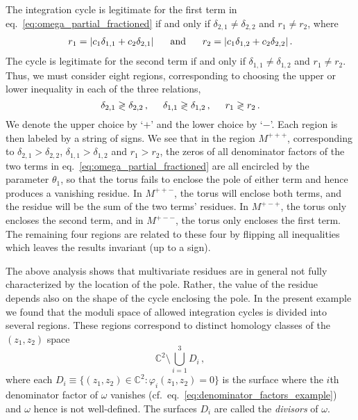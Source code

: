 \documentclass[dvipsnames,preprint,12pt,sort&compress]{elsarticle}
\begin{document}
The integration cycle is legitimate for the first term in eq.~\eqref{eq:omega_partial_fractioned}
if and only if $\delta_{2,1} \neq \delta_{2,2}$ and $r_1 \neq r_2$, where
\begin{align}
r_1 = |c_1\delta_{1,1}+c_2\delta_{2,1}| \hspace{6mm} \mathrm{and} \hspace{6mm}
r_2 = |c_1\delta_{1,2}+c_2\delta_{2,2}|\,.
\end{align}
The cycle is legitimate for the second term if and only if
$\delta_{1,1}\neq\delta_{1,2}$ and $r_1 \neq r_2$. Thus, we must consider
eight regions, corresponding to choosing the upper or lower
inequality in each of the three relations,
\begin{equation}
\delta_{2,1}\gtrless\delta_{2,2}\,, \hspace{5mm}
\delta_{1,1}\gtrless\delta_{1,2}\,, \hspace{5mm}
r_1\gtrless r_2\,.
\label{eq:moduli_space_boundaries}
\end{equation}
We denote the upper choice by `$+$' and the lower choice by `$-$'. Each
region is then labeled by a string of signs. We see that in the region $M^{+++}$,
corresponding to $\delta_{2,1} > \delta_{2,2}$, $\delta_{1,1} > \delta_{1,2}$ and $r_1 > r_2$,
the zeros of all denominator factors of the two terms in eq.~\eqref{eq:omega_partial_fractioned}
are all encircled by the parameter $\theta_1$, so that the torus fails to enclose
the pole of either term and hence produces a vanishing residue.
In $M^{++-}$, the torus will enclose both terms, and the residue will be the sum of
the two terms' residues. In $M^{+-+}$, the torus only encloses the second term,
and in $M^{+--}$, the torus only encloses the first term. The remaining four regions
are related to these four by flipping all inequalities which leaves the results invariant (up to a sign).

The above analysis shows that multivariate residues are in general not fully
characterized by the location of the pole. Rather, the value of the residue depends
also on the shape of the cycle enclosing the pole. In the present example we
found that the moduli space of allowed integration cycles is divided into
several regions. These regions correspond to distinct homology classes of the
$(z_1, z_2)$ space
\begin{equation}
\mathbb{C}^2 \setminus \bigcup_{i=1}^3 D_i \,,
\end{equation}
where each $D_i \equiv \{ (z_1, z_2) \in \mathbb{C}^2 : \varphi_i (z_1, z_2)=0 \}$ is the surface
where the $i$th denominator factor of $\omega$ vanishes
(cf.~eq.~\eqref{eq:denominator_factors_example}) and $\omega$ hence is not well-defined.
The surfaces $D_i$ are called the \emph{divisors} of $\omega$.
\end{document}
